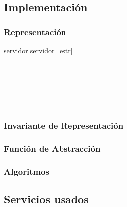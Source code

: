 \subsection{Implementación}

\subsubsection*{Representación}

\begin{Estructura}{servidor}[servidor\_estr]
\begin{Tupla}
\begin{adjustwidth}{3em}{}\ \
  \\
  \\
  \\
\end{adjustwidth}\ \ \ \ \ \ \
\end{Tupla}
\end{Estructura}

\subsubsection*{Invariante de Representación}

\subsubsection*{Función de Abstracción}

\subsubsection*{Algoritmos}

\subsection{Servicios usados}
\newpage

